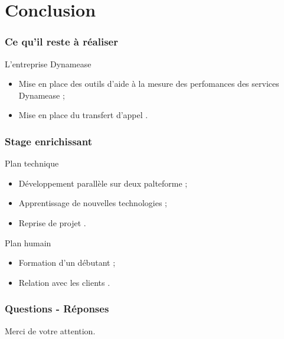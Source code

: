 \section{Conclusion}
\author{Kévin Moreau}


\begin{frame}
	\frametitle{Ce qu'il reste à réaliser}

	\begin{block}{L'entreprise Dynamease}
	 \begin{itemize}
      \item Mise en place des outils d'aide à la mesure des perfomances des services Dynamease ;
      \item Mise en place du transfert d'appel .
	 \end{itemize}
	\end{block}
\end{frame}

\begin{frame}
	\frametitle{Stage enrichissant}

	\begin{block}{Plan technique}
	 \begin{itemize}
      \item Développement parallèle sur deux palteforme ;
	  \item Apprentissage de nouvelles technologies ;
	  \item Reprise de projet .
	 \end{itemize}
	\end{block}

	\begin{block}{Plan humain}
	 \begin{itemize}
      \item Formation d'un débutant ;
	  \item Relation avec les clients .
	 \end{itemize}
	\end{block}

\end{frame}

\begin{frame}
	\frametitle{Questions - Réponses}
	\begin{center}
    	Merci de votre attention.
	\end{center}

\end{frame}



